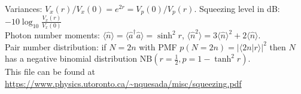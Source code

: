 \documentclass[12pt,letterpaper]{article}
\newcommand{\braket}[1]{\langle #1 \rangle}
\begin{document}
\begin{table}[!h]
{Variances: $V_x(r)/V_x(0) = e^{2r} = V_p(0)/V_p(r)$.  Squeezing level in dB: $-10 \log_{10} \frac{V_x(r)}{V_x(0)}$ \\
Photon number moments: $\langle \hat n \rangle  = \langle \hat a^\dagger \hat a \rangle  = \sinh^2 r$, $\langle \hat n^2 \rangle = 3 \langle \hat n \rangle ^2 + 2 \langle \hat n \rangle$. \\
Pair number distribution: if $N=2n$ with PMF $p(N=2n) = |\braket{2n|r}|^2$ then $N$ has a negative binomial distribution $\text{NB}\left(r=\tfrac{1}{2},p = 1-\tanh^2 r\right)$. \\}
{\tiny This file can be found at \url{https://www.physics.utoronto.ca/~nquesada/misc/squeezing.pdf} }


\end{table}
\end{document}
